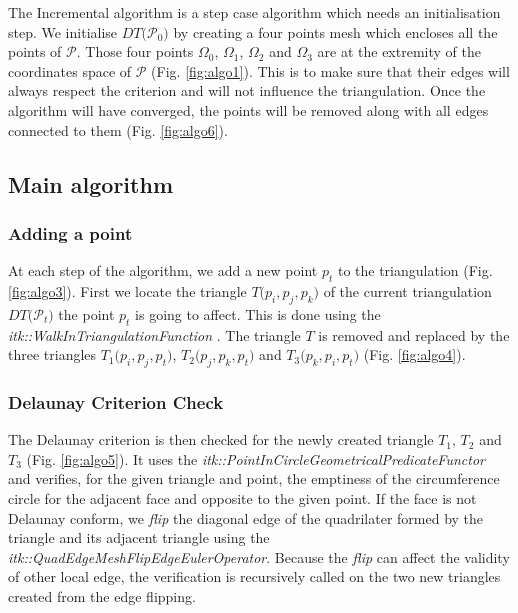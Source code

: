 \documentclass{InsightArticle}
\begin{document}
The Incremental algorithm is a step case algorithm which needs an initialisation step. We initialise $\mathit{DT(}\mathcal{P}_{0}\mathit{)}$ by creating a four points mesh which encloses all the points of $\mathcal{P}$. Those four points $\Omega_{0}$, $\Omega_{1}$, $\Omega_{2}$ and $\Omega_{3}$ are at the extremity of the coordinates space of $\mathcal{P}$ (Fig. \ref{fig:algo1}). This is to make sure that their edges will always respect the criterion and will not influence the triangulation. Once the algorithm will have converged, the points will be removed along with all edges connected to them (Fig. \ref{fig:algo6}).

\subsection{Main algorithm}

\subsubsection{Adding a point}

At each step of the algorithm, we add a new point $\mathit{p_{t}}$ to the triangulation (Fig. \ref{fig:algo3}). First we locate the triangle $\mathit{T}(\mathit{p_{i}},\mathit{p_{j}},\mathit{p_{k})}$ of the current triangulation $\mathit{DT(}\mathcal{P}_{\mathit{t}}\mathit{)}$ the point $\mathit{p_{t}}$ is going to affect. This is done using the \emph{itk::WalkInTriangulationFunction} \cite{Rigaud2012}. The triangle $\mathit{T}$ is removed and replaced by the three triangles $\mathit{T}_{1}(\mathit{p_{i}},\mathit{p_{j}},\mathit{p_{t})}$, $\mathit{T}_{2}(\mathit{p_{j}},\mathit{p_{k}},\mathit{p_{t})}$ and $\mathit{T}_{3}(\mathit{p_{k}},\mathit{p_{i}},\mathit{p_{t})}$ (Fig. \ref{fig:algo4}).

\subsubsection{Delaunay Criterion Check}

The Delaunay criterion is then checked for the newly created triangle $\mathit{T}_{1}$, $\mathit{T}_{2}$ and $\mathit{T}_{3}$ (Fig. \ref{fig:algo5}). It uses the \emph{itk::PointInCircleGeometricalPredicateFunctor} \cite{Moreau2011} and verifies, for the given triangle and point, the emptiness of the circumference circle for the adjacent face and opposite to the given point. If the face is not Delaunay conform, we \emph{flip} the diagonal edge of the quadrilater formed by the triangle and its adjacent triangle using the \emph{itk::QuadEdgeMeshFlipEdgeEulerOperator}. Because the \emph{flip} can affect the validity of other local edge, the verification is recursively called on the two new triangles created from the edge flipping.
\end{document}
